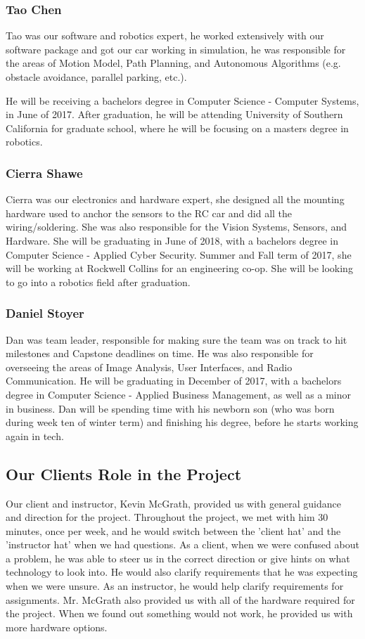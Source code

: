 \documentclass[compsoc,draftclsnofoot,onecolumn,10pt]{IEEEtran}
\begin{document}
\subsubsection*{Tao Chen}
Tao was our software and robotics expert, he worked extensively with our software package and got our car working in simulation, he was responsible for the areas of Motion Model, Path Planning, and Autonomous Algorithms (e.g. obstacle avoidance, parallel parking, etc.).\par
He will be receiving a bachelors degree in Computer Science - Computer Systems, in June of 2017. After graduation, he will be attending University of Southern California for graduate school, where he will be focusing on a masters degree in robotics.

\subsubsection*{Cierra Shawe}
Cierra was our electronics and hardware expert, she designed all the mounting hardware used to anchor the sensors to the RC car and did all the wiring/soldering. She was also responsible for the Vision Systems, Sensors, and Hardware. She will be graduating in June of 2018, with a bachelors degree in Computer Science - Applied Cyber Security. Summer and Fall term of 2017, she will be working at Rockwell Collins for an engineering co-op. She will be looking to go into a robotics field after graduation.

\subsubsection*{Daniel Stoyer}
Dan was team leader, responsible for making sure the team was on track to hit milestones and Capstone deadlines on time. He was also responsible for overseeing the areas of Image Analysis, User Interfaces, and Radio Communication. He will be graduating in December of 2017, with a bachelors degree in Computer Science - Applied Business Management, as well as a minor in business. Dan will be spending time with his newborn son (who was born during week ten of winter term) and finishing his degree, before he starts working again in tech.

\subsection{Our Clients Role in the Project}
Our client and instructor, Kevin McGrath, provided us with general guidance and direction for the project.
Throughout the project, we met with him 30 minutes, once per week, and he would switch between the 'client hat' and the 'instructor hat' when we had questions.
As a client, when we were confused about a problem, he was able to steer us in the correct direction or give hints on what technology to look into.
He would also clarify requirements that he was expecting when we were unsure.
As an instructor, he would help clarify requirements for assignments.
Mr. McGrath also provided us with all of the hardware required for the project. When we found out something would not work, he provided us with more hardware options.
\end{document}
